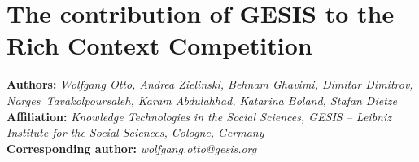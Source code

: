 \documentclass[fleqn]{template}
\begin{document}
    \section{The contribution of GESIS to the Rich Context Competition}
    \textbf{Authors:}
    \emph{Wolfgang Otto, Andrea Zielinski,
         Behnam Ghavimi,
         Dimitar Dimitrov,
         Narges~Tavakolpoursaleh,
         Karam Abdulahhad,
         Katarina Boland,
         Stafan Dietze
        }\\
    \textbf{Affiliation:}
    \emph{Knowledge Technologies in the Social Sciences, GESIS -- Leibniz Institute for the Social Sciences, Cologne, Germany}\\
    \textbf{Corresponding author:}
    \emph{wolfgang.otto@gesis.org} %

    
    
    
    
    
    
    
    
    
    
\end{document}
